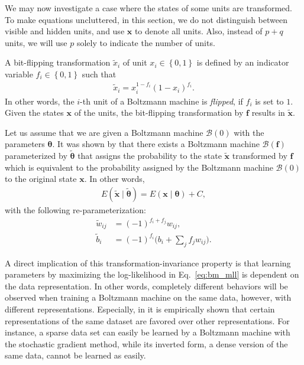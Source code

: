 \documentclass[dissertation,nocontribution]{aaltoseries}
\newcommand{\vect}[1]{\mathbf{#1}}
\newcommand{\vects}[1]{\boldsymbol{#1}}
\newcommand{\vf}[0]{\vect{f}}
\newcommand{\vx}[0]{\vect{x}}
\newcommand{\TT}[0]{{\vects{\theta}}}
\newcommand{\BB}[0]{\mathcal{B}}
\begin{document}
We may now investigate a
case where the states of some units are transformed. To make
equations uncluttered, in this section, we do not
distinguish between visible and hidden units, and use $\vx$
to denote all units. Also, instead of $p+q$ units, we will
use $p$ solely to indicate the number of units.

A bit-flipping transformation $\tilde{x}_i$ of unit $x_i
\in \left\{ 0, 1\right\}$ is defined by an indicator
variable $f_i \in \left\{ 0, 1\right\}$ such that 
\begin{align*}
    \tilde{x}_i = x_i^{1 - f_i} \left( 1 - x_i\right)^{f_i}.
\end{align*}
In other words, the $i$-th unit of a Boltzmann machine is
\textit{flipped}, if $f_i$ is set to $1$. Given the states
$\vx$ of the units, the bit-flipping transformation by $\vf$
results in $\tilde{\vx}$.

Let us assume that we are given a Boltzmann machine $\BB(0)$
with the parameters $\TT$. It was shown by \citet{Cho2013nc}
that there exists a Boltzmann machine $\BB(\vf)$
parameterized by $\tilde{\TT}$ that assigns the probability
to the state $\tilde{\vx}$ transformed by $\vf$ which is
equivalent to the probability assigned by the Boltzmann
machine $\BB(0)$ to the original state $\vx$. In other words,
\begin{align*}
    E(\tilde{\vx} \mid \tilde{\TT})  = E(\vx \mid \TT) + C,
\end{align*}
with the following re-parameterization:
\begin{align}
     \label{eq:bm_tilde_w}
     \tilde{w}_{ij} &= (-1)^{f_i+f_j}w_{ij},
 \\
     \label{eq:bm_tilde_b}
     \tilde{b}_i &= (-1)^{f_i}\biggl(b_i + \sum_j f_j w_{ij}
     \biggr).
\end{align}

A direct implication of this transformation-invariance
property is that learning parameters by maximizing the
log-likelihood in Eq.~\eqref{eq:bm_mll} is dependent on the
data representation. In other words, completely different
behaviors will be observed when training a Boltzmann machine
on the same data, however, with different representations.
Especially, in  it is empirically shown that
certain representations of the same dataset are favored over
other representations. For instance, a sparse data set can
easily be learned by a Boltzmann machine with the stochastic
gradient method, while its inverted form, a dense version of
the same data, cannot be learned as easily.
\end{document}
